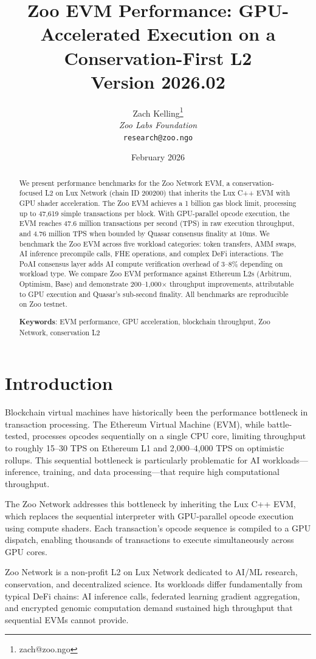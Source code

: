 \documentclass[11pt,letterpaper]{article}
\title{\textbf{Zoo EVM Performance: GPU-Accelerated Execution on a Conservation-First L2}\\
\large Version 2026.02}
\author{
Zach Kelling\thanks{zach@zoo.ngo}\\
\textit{Zoo Labs Foundation}\\
\texttt{research@zoo.ngo}
}
\date{February 2026}
\begin{document}
\zoocoverpage

\begin{abstract}
We present performance benchmarks for the Zoo Network EVM, a conservation-focused L2 on Lux Network (chain ID 200200) that inherits the Lux C++ EVM with GPU shader acceleration. The Zoo EVM achieves a 1 billion gas block limit, processing up to 47,619 simple transactions per block. With GPU-parallel opcode execution, the EVM reaches 47.6 million transactions per second (TPS) in raw execution throughput, and 4.76 million TPS when bounded by Quasar consensus finality at 10ms. We benchmark the Zoo EVM across five workload categories: token transfers, AMM swaps, AI inference precompile calls, FHE operations, and complex DeFi interactions. The PoAI consensus layer adds AI compute verification overhead of 3--8\% depending on workload type. We compare Zoo EVM performance against Ethereum L2s (Arbitrum, Optimism, Base) and demonstrate 200--1,000$\times$ throughput improvements, attributable to GPU execution and Quasar's sub-second finality. All benchmarks are reproducible on Zoo testnet.

\textbf{Keywords}: EVM performance, GPU acceleration, blockchain throughput, Zoo Network, conservation L2
\end{abstract}

\section{Introduction}

Blockchain virtual machines have historically been the performance bottleneck in transaction processing. The Ethereum Virtual Machine (EVM), while battle-tested, processes opcodes sequentially on a single CPU core, limiting throughput to roughly 15--30 TPS on Ethereum L1 and 2,000--4,000 TPS on optimistic rollups. This sequential bottleneck is particularly problematic for AI workloads---inference, training, and data processing---that require high computational throughput.

The Zoo Network addresses this bottleneck by inheriting the Lux C++ EVM, which replaces the sequential interpreter with GPU-parallel opcode execution using compute shaders. Each transaction's opcode sequence is compiled to a GPU dispatch, enabling thousands of transactions to execute simultaneously across GPU cores.

Zoo Network is a non-profit L2 on Lux Network dedicated to AI/ML research, conservation, and decentralized science. Its workloads differ fundamentally from typical DeFi chains: AI inference calls, federated learning gradient aggregation, and encrypted genomic computation demand sustained high throughput that sequential EVMs cannot provide.
\end{document}
